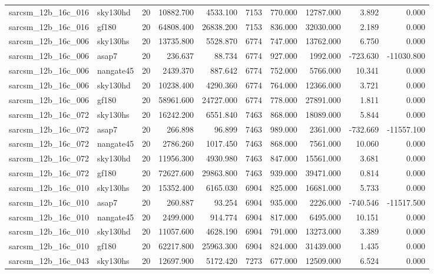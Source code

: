 \documentclass{article}
\begin{document}
\begin{longtable}{llrrrrrrrr}
sarcsm\_12b\_16c\_016 & sky130hd & 20 & 10882.700 & 4533.100 & 7153 & 770.000 & 12787.000 & 3.892 & 0.000 \\
sarcsm\_12b\_16c\_016 & gf180 & 20 & 64808.400 & 26838.200 & 7153 & 836.000 & 32030.000 & 2.189 & 0.000 \\
sarcsm\_12b\_16c\_006 & sky130hs & 20 & 13735.800 & 5528.870 & 6774 & 747.000 & 13762.000 & 6.750 & 0.000 \\
sarcsm\_12b\_16c\_006 & asap7 & 20 & 236.637 & 88.734 & 6774 & 927.000 & 1992.000 & -723.630 & -11030.800 \\
sarcsm\_12b\_16c\_006 & nangate45 & 20 & 2439.370 & 887.642 & 6774 & 752.000 & 5766.000 & 10.341 & 0.000 \\
sarcsm\_12b\_16c\_006 & sky130hd & 20 & 10238.400 & 4290.360 & 6774 & 764.000 & 12366.000 & 3.721 & 0.000 \\
sarcsm\_12b\_16c\_006 & gf180 & 20 & 58961.600 & 24727.000 & 6774 & 778.000 & 27891.000 & 1.811 & 0.000 \\
sarcsm\_12b\_16c\_072 & sky130hs & 20 & 16242.200 & 6551.840 & 7463 & 868.000 & 18089.000 & 5.844 & 0.000 \\
sarcsm\_12b\_16c\_072 & asap7 & 20 & 266.898 & 96.899 & 7463 & 989.000 & 2361.000 & -732.669 & -11557.100 \\
sarcsm\_12b\_16c\_072 & nangate45 & 20 & 2786.260 & 1017.450 & 7463 & 868.000 & 7561.000 & 10.060 & 0.000 \\
sarcsm\_12b\_16c\_072 & sky130hd & 20 & 11956.300 & 4930.980 & 7463 & 847.000 & 15561.000 & 3.681 & 0.000 \\
sarcsm\_12b\_16c\_072 & gf180 & 20 & 72627.600 & 29863.800 & 7463 & 939.000 & 39471.000 & 0.814 & 0.000 \\
sarcsm\_12b\_16c\_010 & sky130hs & 20 & 15352.400 & 6165.030 & 6904 & 825.000 & 16681.000 & 5.733 & 0.000 \\
sarcsm\_12b\_16c\_010 & asap7 & 20 & 260.887 & 93.254 & 6904 & 935.000 & 2226.000 & -740.546 & -11517.500 \\
sarcsm\_12b\_16c\_010 & nangate45 & 20 & 2499.000 & 914.774 & 6904 & 817.000 & 6495.000 & 10.151 & 0.000 \\
sarcsm\_12b\_16c\_010 & sky130hd & 20 & 11057.600 & 4628.190 & 6904 & 791.000 & 13273.000 & 3.389 & 0.000 \\
sarcsm\_12b\_16c\_010 & gf180 & 20 & 62217.800 & 25963.300 & 6904 & 824.000 & 31439.000 & 1.435 & 0.000 \\
sarcsm\_12b\_16c\_043 & sky130hs & 20 & 12697.900 & 5172.420 & 7273 & 677.000 & 12509.000 & 6.524 & 0.000 \\

\end{longtable}
\end{document}
